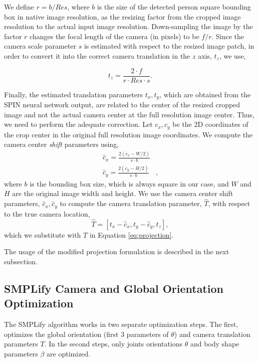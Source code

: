 \documentclass[runningheads]{llncs}
\begin{document}
 We define $ r = b/Res $, where $b$ is the size of the detected person square bounding box in native image resolution, as the resizing factor from the  cropped image resolution to the actual input image resolution. Down-sampling the image by the factor $r$ changes the focal length of the camera (in pixels) to be $ f/r $. Since the camera scale parameter $ s $ is estimated with respect to the resized image patch, in order to convert it into the correct camera translation in the $z$ axis, $ t_z $, we use,

\begin{equation}
t_z = \frac{2 \cdot f}{r \cdot Res \cdot s}.
\label{tz_2}
\end{equation}




Finally, the estimated translation parameters $ t_x, t_y $, which are obtained from the SPIN neural network output, are related to the center of the resized cropped image and not the actual camera center at the full resolution image center. Thus, we need to perform the adequate correction.  Let $ c_x, c_y $ be the 2D coordinates of the crop center in the original full resolution image coordinates. We compute the  camera center \emph{shift} parameters using,
\begin{align}
\hat c_x = \frac{2\left(c_x - W/2\right)}{s \cdot b}&\\
\hat c_y = \frac{2\left(c_y - H/2\right)}{s \cdot b}&, \nonumber
\label{shifts}
\end{align}
where $ b $ is the bounding box size, which is always square in our case, and $ W $ and $ H $ are the original image width and height.
We use the camera center shift parameters, $ \hat c_x, \hat c_y $ to compute the camera translation parameter, $ \hat T $, with respect to the true camera location,
\begin{equation}
\hat T = \left[ t_x - \hat c_x, t_y - \hat c_y, t_z \right],
\label{hat_T}
\end{equation}
which we substitute with $ T $ in Equation \ref{eq:projection}.

The usage of the modified projection formulation is described in the next subsection.

\subsection{SMPLify Camera and Global Orientation Optimization}
\label{sec:smplify_camera_opt}
The SMPLify algorithm works in two separate optimization steps. The first, optimizes the global orientation (first 3 parameters of $ \theta $) and camera translation parameters $ T $. In the second steps, only joints orientations $ \theta $ and body shape parameters $ \beta $ are optimized. 
\end{document}
